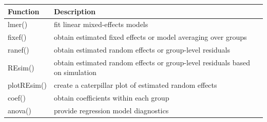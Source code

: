 \documentclass[
]{book}
\begin{document}
\begin{longtable}[]{@{}ll@{}}
\toprule
\begin{minipage}[b]{0.17\columnwidth}\raggedright
Function\strut
\end{minipage} & \begin{minipage}[b]{0.77\columnwidth}\raggedright
Description\strut
\end{minipage}\tabularnewline
\midrule
\endhead
\begin{minipage}[t]{0.17\columnwidth}\raggedright
lmer()\strut
\end{minipage} & \begin{minipage}[t]{0.77\columnwidth}\raggedright
fit linear mixed-effects models\strut
\end{minipage}\tabularnewline
\begin{minipage}[t]{0.17\columnwidth}\raggedright
fixef()\strut
\end{minipage} & \begin{minipage}[t]{0.77\columnwidth}\raggedright
obtain estimated fixed effects or model averaging over groups\strut
\end{minipage}\tabularnewline
\begin{minipage}[t]{0.17\columnwidth}\raggedright
ranef()\strut
\end{minipage} & \begin{minipage}[t]{0.77\columnwidth}\raggedright
obtain estimated random effects or group-level residuals\strut
\end{minipage}\tabularnewline
\begin{minipage}[t]{0.17\columnwidth}\raggedright
REsim()\strut
\end{minipage} & \begin{minipage}[t]{0.77\columnwidth}\raggedright
obtain estimated random effects or group-level residuals based on simulation\strut
\end{minipage}\tabularnewline
\begin{minipage}[t]{0.17\columnwidth}\raggedright
plotREsim()\strut
\end{minipage} & \begin{minipage}[t]{0.77\columnwidth}\raggedright
create a caterpillar plot of estimated random effects\strut
\end{minipage}\tabularnewline
\begin{minipage}[t]{0.17\columnwidth}\raggedright
coef()\strut
\end{minipage} & \begin{minipage}[t]{0.77\columnwidth}\raggedright
obtain coefficients within each group\strut
\end{minipage}\tabularnewline
\begin{minipage}[t]{0.17\columnwidth}\raggedright
anova()\strut
\end{minipage} & \begin{minipage}[t]{0.77\columnwidth}\raggedright
provide regression model diagnostics\strut
\end{minipage}\tabularnewline
\bottomrule
\end{longtable}
\end{document}
